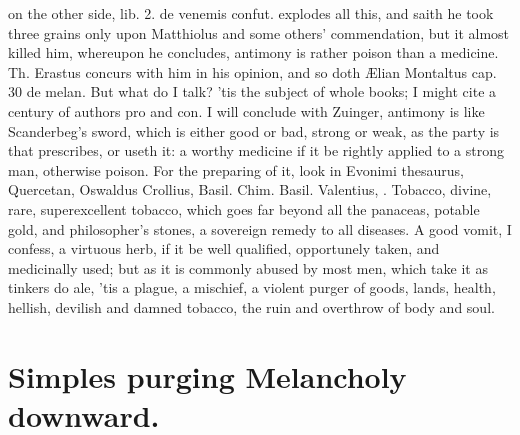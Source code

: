 {on the other side, lib. 2. de venemis confut. explodes all this, and
saith he took three grains only upon Matthiolus and some others'
commendation, but it almost killed him, whereupon he concludes,
antimony is rather poison than a medicine. Th. Erastus concurs
with him in his opinion, and so doth \AE{}lian Montaltus cap. 30 de melan.
But what do I talk? 'tis the subject of whole books; I might cite a
century of authors pro and con. I will conclude with Zuinger,
antimony is like Scanderbeg's sword, which is either good or bad,
strong or weak, as the party is that prescribes, or useth it: a worthy
medicine if it be rightly applied to a strong man, otherwise poison.
For the preparing of it, look in Evonimi thesaurus, Quercetan, Oswaldus
Crollius, Basil. Chim. Basil. Valentius, \etc{}.
Tobacco, divine, rare, superexcellent tobacco, which goes far beyond
all the panaceas, potable gold, and philosopher's stones, a sovereign
remedy to all diseases. A good vomit, I confess, a virtuous herb, if it
be well qualified, opportunely taken, and medicinally used; but as it
is commonly abused by most men, which take it as tinkers do ale, 'tis a
plague, a mischief, a violent purger of goods, lands, health, hellish,
devilish and damned tobacco, the ruin and overthrow of body and soul.

\section{Simples purging Melancholy downward.}

}
